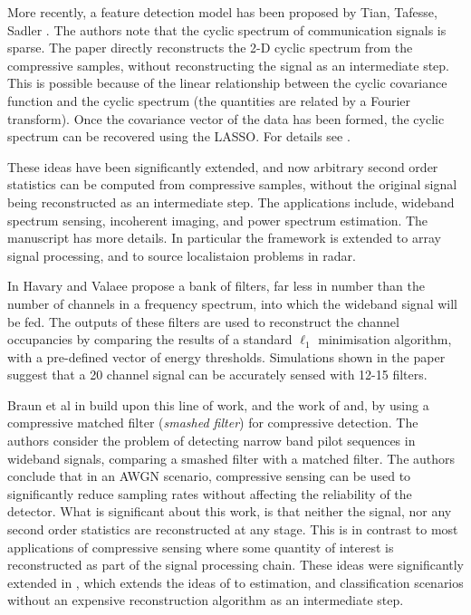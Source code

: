 More recently, a feature detection model has been proposed by Tian, Tafesse, Sadler \cite{tian2012cyclic}. The authors note that the cyclic spectrum of communication signals is sparse. The paper directly reconstructs the 2-D cyclic spectrum from the compressive samples, without reconstructing the signal as an intermediate step. This is possible because of the linear relationship between the cyclic covariance function and the cyclic spectrum (the quantities are related by a Fourier transform). Once the covariance vector of the data has been formed, the cyclic spectrum can be recovered using the LASSO. For details see \cite{tian2012cyclic}.

These ideas have been significantly extended, and now arbitrary second order statistics can be computed from compressive samples, without the original signal being reconstructed as an intermediate step. The applications include, wideband spectrum sensing, incoherent imaging, and power spectrum estimation. The manuscript \cite{romero2016compressive} has more details. In particular the framework is extended to array signal processing, and to source localistaion problems in radar.

In \cite{havary2010compressive} Havary and Valaee propose a bank of filters, far less in  number than the number of channels in a frequency spectrum, into which the wideband signal will be fed. The outputs of these filters are used to reconstruct the channel occupancies by comparing the results of a standard \(\ell_1\) minimisation algorithm, with a pre-defined vector of energy thresholds. Simulations shown in the paper suggest that a 20 channel signal can be accurately sensed with 12-15 filters.

Braun et al in \cite{braun2009signal} build upon this line of work, and the work of \cite{Davenport2007} and, by using a compressive matched filter (\textit{smashed filter}) for compressive detection. The authors consider the problem of detecting narrow band pilot sequences in wideband signals, comparing a smashed filter with a matched filter. The authors conclude that in an AWGN scenario, compressive sensing can be used to significantly reduce sampling rates without affecting the reliability of the detector. What is significant about this work, is that neither the signal, nor any second order statistics are reconstructed at any stage. This is in contrast to most applications of compressive sensing where some quantity of interest is reconstructed as part of the signal processing chain. These ideas were significantly extended in \cite{davenport2010signal}, which extends the ideas of \cite{Davenport2007} to estimation, and classification scenarios without an expensive reconstruction algorithm as an intermediate step.

